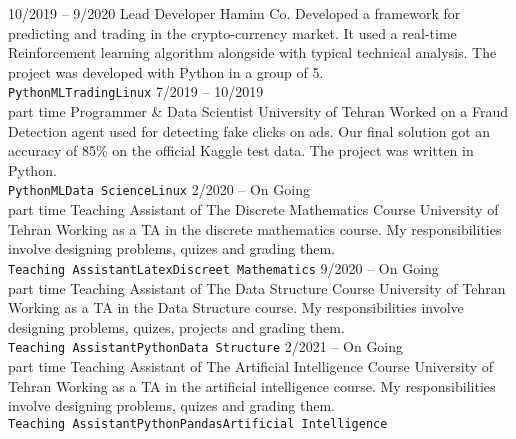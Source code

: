 \documentclass[9pt]{developercv} %
\begin{document}
\begin{entrylist}
	\entry
		{10/2019 -- 9/2020}
		{Lead Developer}
		{Hamim Co.}
		{Developed a framework for predicting and trading in the crypto-currency market. It used a real-time Reinforcement learning algorithm alongside with typical technical analysis. The project was developed with Python in a group of 5.\\ \texttt{Python}\slashsep\texttt{ML}\slashsep\texttt{Trading}\slashsep\texttt{Linux}}
	\entry
		{7/2019 -- 10/2019\\\footnotesize{part time}}
		{Programmer \& Data Scientist}
		{University of Tehran}
		{Worked on a Fraud Detection agent used for detecting fake clicks on ads. Our final solution got an accuracy of 85\% on the official Kaggle test data. The project was written in Python. \\ \texttt{Python}\slashsep\texttt{ML}\slashsep\texttt{Data Science}\slashsep\texttt{Linux} }
	\entry
		{2/2020 -- On Going\\\footnotesize{part time}}
		{Teaching Assistant of The Discrete Mathematics Course}
		{University of Tehran}
		{Working as a TA in the discrete mathematics course. My responsibilities involve designing problems, quizes and grading them.    \\ \texttt{Teaching Assistant}\slashsep\texttt{Latex}\slashsep\texttt{Discreet Mathematics}}
	\entry
		{9/2020 -- On Going\\\footnotesize{part time}}
		{Teaching Assistant of The Data Structure Course}
		{University of Tehran}
		{Working as a TA in the Data Structure course. My responsibilities involve designing problems, quizes, projects and grading them.    \\ \texttt{Teaching Assistant}\slashsep\texttt{Python}\slashsep\texttt{Data Structure}}
	\entry
		{2/2021 -- On Going\\\footnotesize{part time}}
		{Teaching Assistant of The Artificial Intelligence Course}
		{University of Tehran}
		{Working as a TA in the artificial intelligence course. My responsibilities involve designing problems, quizes and grading them.    \\ \texttt{Teaching Assistant}\slashsep\texttt{Python}\slashsep\texttt{Pandas}\slashsep\texttt{Artificial Intelligence}}
\end{entrylist}

\end{document}
